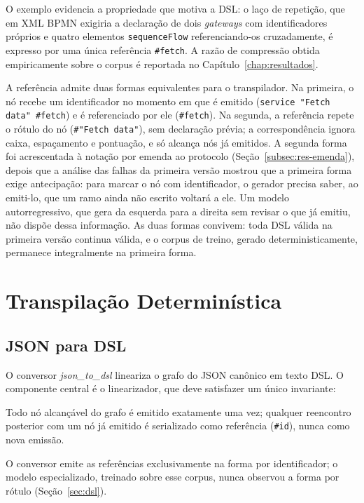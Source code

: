 O exemplo evidencia a propriedade que motiva a DSL: o laço de repetição, que em XML BPMN exigiria a declaração de dois \textit{gateways} com identificadores próprios e quatro elementos \texttt{sequenceFlow} referenciando-os cruzadamente, é expresso por uma única referência \texttt{\#fetch}. A razão de compressão obtida empiricamente sobre o corpus é reportada no Capítulo~\ref{chap:resultados}.

A referência admite duas formas equivalentes para o transpilador. Na primeira, o nó recebe um identificador no momento em que é emitido (\verb|service "Fetch data" #fetch|) e é referenciado por ele (\verb|#fetch|). Na segunda, a referência repete o rótulo do nó (\verb|#"Fetch data"|), sem declaração prévia; a correspondência ignora caixa, espaçamento e pontuação, e só alcança nós já emitidos. A segunda forma foi acrescentada à notação por emenda ao protocolo (Seção~\ref{subsec:res-emenda}), depois que a análise das falhas da primeira versão mostrou que a primeira forma exige antecipação: para marcar o nó com identificador, o gerador precisa saber, ao emiti-lo, que um ramo ainda não escrito voltará a ele. Um modelo autorregressivo, que gera da esquerda para a direita sem revisar o que já emitiu, não dispõe dessa informação. As duas formas convivem: toda DSL válida na primeira versão continua válida, e o corpus de treino, gerado deterministicamente, permanece integralmente na primeira forma.

\section{Transpilação Determinística}
\label{sec:transpilacao}

\subsection{JSON para DSL}
\label{subsec:json-to-dsl}

O conversor \textit{json\_to\_dsl} lineariza o grafo do JSON canônico em texto DSL. O componente central é o linearizador, que deve satisfazer um único invariante:

\begin{citacao}
Todo nó alcançável do grafo é emitido exatamente uma vez; qualquer reencontro posterior com um nó já emitido é serializado como referência (\texttt{\#id}), nunca como nova emissão.
\end{citacao}

O conversor emite as referências exclusivamente na forma por identificador; o modelo especializado, treinado sobre esse corpus, nunca observou a forma por rótulo (Seção~\ref{sec:dsl}).

